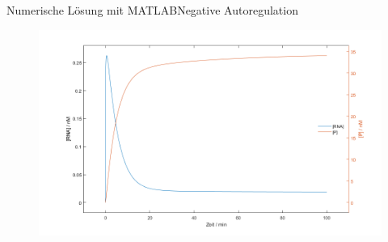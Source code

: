 \documentclass[11pt,aspectratio=169,reqno]{beamer}
\begin{document}
\begin{frame}{Numerische Lösung mit MATLAB\hfill {\small \textcolor{ETHBlue}{Negative Autoregulation}}}
\begin{figure}
    \centering
    \includegraphics[width=.7\textwidth]{images/simulations/negative_autoregulation_basic.m.png}
\end{figure}
\end{frame}
\end{document}
